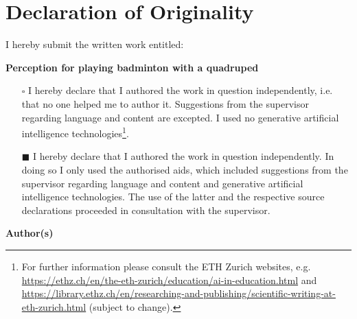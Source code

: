 
\section*{Declaration of Originality}

\vspace{0.5cm}

I hereby submit the written work entitled:

\vspace{0.5cm}

\textbf{Perception for playing badminton with a quadruped}

\vspace{0.25cm}


\begin{itemize}
   \item[$\square$] I hereby declare that I authored the work in question independently, i.e. that no one helped me to author it. Suggestions from the supervisor regarding language and content are excepted. I used no generative artificial intelligence technologies\footnote{For further information please consult the ETH Zurich websites, e.g. \url{https://ethz.ch/en/the-eth-zurich/education/ai-in-education.html} and \url{https://library.ethz.ch/en/researching-and-publishing/scientific-writing-at-eth-zurich.html} (subject to change).}.
   \item[$\blacksquare$] I hereby declare that I authored the work in question independently. In doing so I only used the authorised aids, which included suggestions from the supervisor regarding language and content and generative artificial intelligence technologies. The use of the latter and the respective source declarations proceeded in consultation with the supervisor.
\end{itemize}

\vspace{0.5cm}

\textbf{Author(s)}

\vspace{0.5cm}

